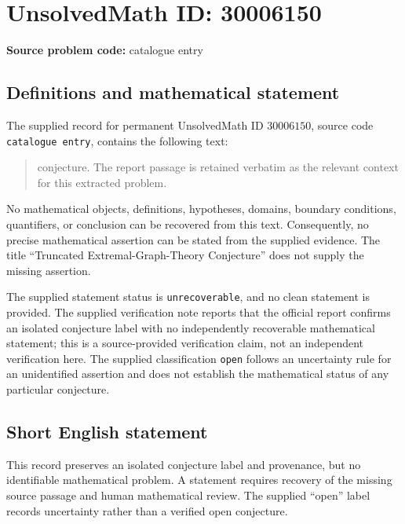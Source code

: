 \documentclass[11pt]{article}
\begin{document}
\section*{UnsolvedMath ID: 30006150}
\textbf{Source problem code:} catalogue entry
\subsection{Definitions and mathematical statement}
The supplied record for permanent UnsolvedMath ID \(30006150\), source code \texttt{catalogue entry}, contains the following text:
\begin{quote}
conjecture. The report passage is retained verbatim as the relevant context for this extracted problem.
\end{quote}
No mathematical objects, definitions, hypotheses, domains, boundary conditions, quantifiers, or conclusion can be recovered from this text. Consequently, no precise mathematical assertion can be stated from the supplied evidence. The title ``Truncated Extremal-Graph-Theory Conjecture'' does not supply the missing assertion.

The supplied statement status is \texttt{unrecoverable}, and no clean statement is provided. The supplied verification note reports that the official report confirms an isolated conjecture label with no independently recoverable mathematical statement; this is a source-provided verification claim, not an independent verification here. The supplied classification \texttt{open} follows an uncertainty rule for an unidentified assertion and does not establish the mathematical status of any particular conjecture.
\subsection{Short English statement}
This record preserves an isolated conjecture label and provenance, but no identifiable mathematical problem. A statement requires recovery of the missing source passage and human mathematical review. The supplied ``open'' label records uncertainty rather than a verified open conjecture.
\end{document}
